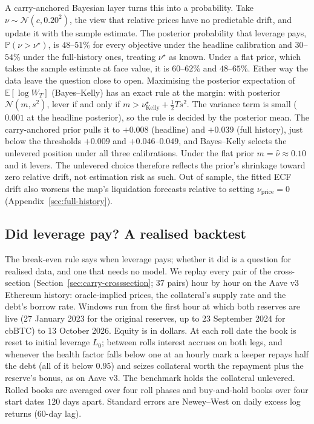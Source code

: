 \documentclass[11pt]{article}
\newcommand{\E}{\mathbb{E}}
\renewcommand{\P}{\mathbb{P}}
\theoremstyle{plain}
\theoremstyle{definition}
\theoremstyle{remark}
\begin{document}
A carry-anchored Bayesian layer turns this into a probability. Take $\nu\sim\mathcal N(c,0.20^2)$,
the view that relative prices have no predictable drift, and update it with the sample estimate.
The posterior probability that leverage pays, $\P(\nu>\nu^\star)$, is $48$--$51\%$ for every objective
under the headline calibration and $30$--$54\%$ under the full-history ones, treating $\nu^\star$ as
known. Under a flat prior, which takes the sample estimate at face value, it is $60$--$62\%$ and
$48$--$65\%$. Either way the data leave the question close to open. Maximising the posterior
expectation of $\E[\log W_T]$ (Bayes--Kelly) has an exact rule at the margin: with posterior
$\mathcal N(m,s^2)$, lever if and only if $m>\nu^\star_{\mathrm{Kelly}}+\tfrac12Ts^2$. The variance
term is small ($0.001$ at the headline posterior), so the rule is decided by the posterior mean. The
carry-anchored prior pulls it to $+0.008$ (headline) and $+0.039$ (full history), just below the
thresholds $+0.009$ and $+0.046$--$0.049$, and Bayes--Kelly selects the unlevered position under all
three calibrations. Under the flat prior $m=\hat\nu\approx0.10$ and it levers. The unlevered choice
therefore reflects the prior's shrinkage toward zero relative drift, not estimation risk as such. Out of sample, the fitted ECF drift also worsens the map's
liquidation forecasts relative to setting $\nu_{\mathrm{price}}=0$ (Appendix~\ref{sec:full-history}).

\subsection{Did leverage pay? A realised backtest}\label{sec:realised}
The break-even rule says when leverage pays; whether it did is a question for realised data, and
one that needs no model. We replay every pair of the cross-section (Section~\ref{sec:carry-crosssection};
$37$ pairs) hour by hour on the Aave v3 Ethereum history: oracle-implied prices, the collateral's
supply rate and the debt's borrow rate. Windows run from the first hour at which both reserves are
live (27 January 2023 for the original reserves, up to 23 September 2024 for cbBTC) to 13 October
2026. Equity is in dollars. At each roll date the book is reset to initial leverage $L_0$; between
rolls interest accrues on both legs, and whenever the health factor falls below one at an hourly
mark a keeper repays half the debt (all of it below $0.95$) and seizes collateral worth the repayment
plus the reserve's bonus, as on Aave v3. The benchmark holds the collateral unlevered. Rolled books
are averaged over four roll phases and buy-and-hold books over four start dates $120$ days apart.
Standard errors are Newey--West on daily excess log returns ($60$-day lag).
\end{document}
